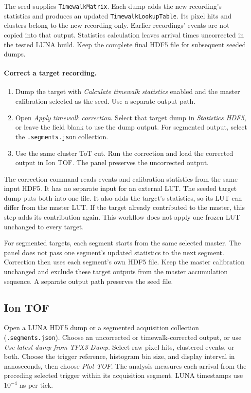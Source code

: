 \documentclass[11pt,a4paper]{article}
\newcommand{\code}[1]{\texttt{#1}}
\begin{document}
The seed supplies \code{TimewalkMatrix}. Each dump adds the new recording's
statistics and produces an updated \code{TimewalkLookupTable}.
Its pixel hits and clusters belong to the new recording only.
Earlier recordings' events are not copied into that output.
Statistics calculation leaves arrival times uncorrected in the tested LUNA build.
Keep the complete final HDF5 file for subsequent seeded dumps.

\paragraph{Correct a target recording.}
\begin{enumerate}[leftmargin=*]
  \item Dump the target with \emph{Calculate timewalk statistics} enabled
        and the master calibration selected as the seed.
        Use a separate output path.
  \item Open \emph{Apply timewalk correction}. Select that target dump in
        \emph{Statistics HDF5}, or leave the field blank to use the dump output.
        For segmented output, select the \code{.segments.json} collection.
  \item Use the same cluster ToT cut. Run the correction and load the
        corrected output in Ion TOF. The panel preserves the uncorrected output.
\end{enumerate}

The correction command reads events and calibration statistics from the same
input HDF5. It has no separate input for an external LUT.
The seeded target dump puts both into one file. It also adds the target's
statistics, so its LUT can differ from the master LUT.
If the target already contributed to the master, this step adds its contribution
again. This workflow does not apply one frozen LUT unchanged to every target.

For segmented targets, each segment starts from the same selected master.
The panel does not pass one segment's updated statistics to the next segment.
Correction then uses each segment's own HDF5 file.
Keep the master calibration unchanged and exclude these target outputs from
the master accumulation sequence. A separate output path preserves the seed file.

\subsection{Ion TOF}

Open a LUNA HDF5 dump or a segmented acquisition collection
(\code{.segments.json}). Choose an uncorrected or timewalk-corrected output,
or use \emph{Use latest dump from TPX3 Dump}. Select raw pixel hits,
clustered events, or both. Choose the trigger reference, histogram bin
size, and display interval in nanoseconds, then choose \emph{Plot TOF}.
The analysis measures each arrival from the preceding selected trigger
within its acquisition segment. LUNA timestamps use $10^{-4}$ ns per tick.
\end{document}
